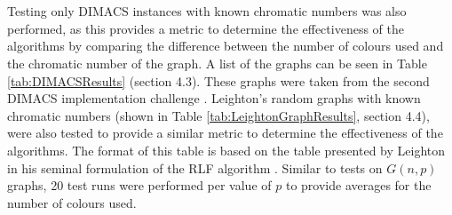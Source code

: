 \\\\
Testing only DIMACS instances with known chromatic numbers was also performed, as this provides a metric to determine the effectiveness of the algorithms by comparing the difference between the number of colours used and the chromatic number of the graph. A list of the graphs can be seen in Table \ref{tab:DIMACSResults} (section 4.3). These graphs were taken from the second DIMACS implementation challenge \cite{DIMACSChallenge2}. Leighton's random graphs with known chromatic numbers (shown in Table \ref{tab:LeightonGraphResults}, section 4.4), were also tested to provide a similar metric to determine the effectiveness of the algorithms. The format of this table is based on the table presented by Leighton in his seminal formulation of the RLF algorithm \cite{Leighton1979AGC}. Similar to tests on $G(n, p)$ graphs, 20 test runs were performed per value of $p$ to provide averages for the number of colours used.
